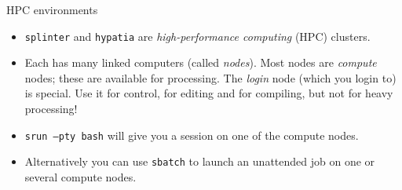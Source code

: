 \documentclass[dvipsnames]{beamer}
\newcommand{\command}[1]{\colorbox{light-gray}{\texttt{#1}}}
\newcommand{\server}[1]{\textcolor{BrickRed}{\texttt{#1}}}
\begin{document}
\begin{frame}{HPC environments}
\begin{itemize}
\item \server{splinter} and \server{hypatia} are \textit{high-performance computing} (HPC) clusters.
\item Each has many linked computers (called \textit{nodes}). Most nodes are \textit{compute} nodes; these are available for processing. The \textit{login} node (which you login to) is special. Use it for control, for editing and for compiling, but not for heavy processing!
\item \command{srun --pty bash} will give you a session on one of the compute nodes.
\item Alternatively you can use \command{sbatch} to launch an unattended job on one or several compute nodes.
\end{itemize}
\end{frame}
\end{document}
